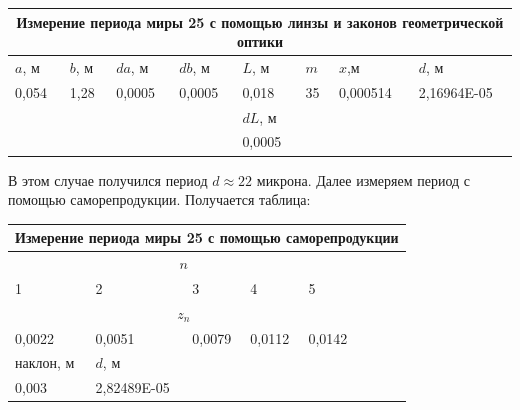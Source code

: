 \documentclass[a4paper,12pt]{article}
\begin{document}
\begin{table}[h!]
	\begin{tabular}{llll|l|lll}
		\hline
		\multicolumn{8}{|c|}{Измерение   периода миры 25 с помощью линзы и законов геометрической оптики}                                                                                                    \\ \hline
		\multicolumn{1}{|l|}{$a$, м}  & \multicolumn{1}{l|}{$b$, м} & \multicolumn{1}{l|}{$da$, м}  & $db$, м  & $L$, м   & \multicolumn{1}{l|}{$m$}  & \multicolumn{1}{l|}{$x$,м}      & \multicolumn{1}{l|}{$d$, м}        \\ \hline
		\multicolumn{1}{|l|}{0,054} & \multicolumn{1}{l|}{1,28} & \multicolumn{1}{l|}{0,0005} & 0,0005 & 0,018  & \multicolumn{1}{l|}{35} & \multicolumn{1}{l|}{0,000514} & \multicolumn{1}{l|}{2,16964E-05} \\ \hline
		&                           &                             &        & $dL$, м  &                         &                               &                                  \\ \cline{5-5}
		&                           &                             &        & 0,0005 &                         &                               &                                  \\ \cline{5-5}
	\end{tabular}
\end{table}
В этом случае получился период $d \approx 22$ микрона.
\newpage
Далее измеряем период с помощью саморепродукции. Получается таблица:
\begin{table}[h!]
	\begin{tabular}{|l|l|llllll}
		\hline
		\multicolumn{8}{|c|}{Измерение   периода миры 25 с помощью саморепродукции}                                                \\ \hline
		\multicolumn{5}{|c|}{$n$}                                                                                           &  &  &  \\ \cline{1-5}
		1         & 2           & \multicolumn{1}{l|}{3}      & \multicolumn{1}{l|}{4}      & \multicolumn{1}{l|}{5}      &  &  &  \\ \cline{1-5}
		\multicolumn{5}{|c|}{$z_n$}                                                                                        &  &  &  \\ \cline{1-5}
		0,0022    & 0,0051      & \multicolumn{1}{l|}{0,0079} & \multicolumn{1}{l|}{0,0112} & \multicolumn{1}{l|}{0,0142} &  &  &  \\ \cline{1-5}
		наклон, м & $d$, м        &                             &                             &                             &  &  &  \\ \cline{1-2}
		0,003     & 2,82489E-05 &                             &                             &                             &  &  &  \\ \cline{1-2}
	\end{tabular}
\end{table}
\end{document}
